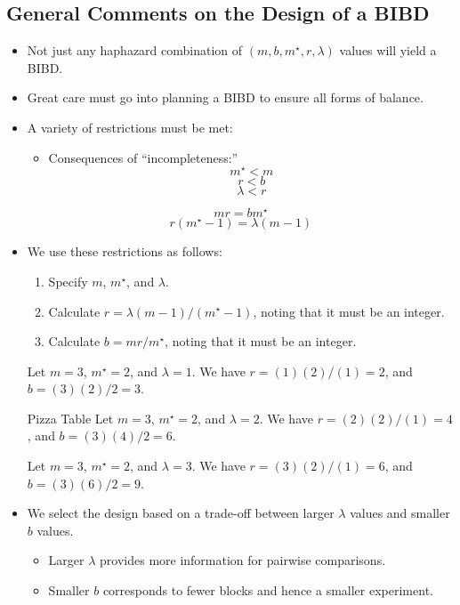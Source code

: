 \subsection{General Comments on the Design of a BIBD}
\begin{itemize}
    \item Not just any haphazard combination of $ (m,b,m^\star,r,\lambda) $ values will yield a BIBD\@.
    \item Great care must go into planning a BIBD to ensure all forms of balance.
    \item A variety of restrictions must be met:
          \begin{itemize}
              \item Consequences of ``incompleteness:''
                    \[ m^\star<m \]
                    \[ r<b \]
                    \[ \lambda<r \]
          \end{itemize}
          \[ mr=bm^\star \]
          \[ r(m^\star-1)=\lambda(m-1) \]
    \item We use these restrictions as follows:
          \begin{enumerate}
              \item Specify $ m $, $ m^\star $, and $ \lambda $.
              \item Calculate $ r=\lambda(m-1)/(m^\star-1) $, noting that it must be an integer.
              \item Calculate $ b=mr/m^\star $, noting that it must be an integer.
          \end{enumerate}
          \begin{Example}{}{}
              Let $ m=3 $, $ m^\star=2 $, and $ \lambda=1 $. We have
              $ r=(1)(2)/(1) =2 $, and
              $ b=(3)(2)/2 =3 $.
          \end{Example}
          \begin{Example}{Pizza Table}{}
              Let $ m=3 $, $ m^\star=2 $, and $ \lambda=2 $. We have
              $ r=(2)(2)/(1) =4 $, and
              $ b=(3)(4)/2 =6 $.
          \end{Example}
          \begin{Example}{}{}
              Let $ m=3 $, $ m^\star=2 $, and $ \lambda=3 $. We have
              $ r=(3)(2)/(1) =6 $, and
              $ b=(3)(6)/2 =9 $.
          \end{Example}
    \item We select the design based on a trade-off between larger $ \lambda $ values and smaller $ b $ values.
          \begin{itemize}
              \item Larger $ \lambda $ provides more information for pairwise comparisons.
              \item Smaller $ b $ corresponds to fewer blocks and hence a smaller experiment.
          \end{itemize}
\end{itemize}
